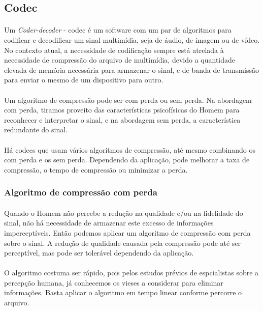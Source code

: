 \documentclass[a4paper,12pt]{article}
\begin{document}
\subsection{Codec}

\paragraph{}
Um \textit{Coder-decoder} - codec é um software com um par de algoritmos para codificar e decodificar um sinal multimídia, seja de áudio, de imagem ou de vídeo. No contexto atual, a necessidade de codificação sempre está atrelada à necessidade de compressão do arquivo de multimídia, devido a quantidade elevada de memória necessária para armazenar o sinal, e de banda de transmissão para enviar o mesmo de um dispositivo para outro.

\paragraph{}
Um algoritmo de compressão pode ser com perda ou sem perda. Na abordagem com perda, tiramos proveito das características psicofísicas do Homem para reconhecer e interpretar o sinal, e na abordagem sem perda, a característica redundante do sinal.

\paragraph{}
Há codecs que usam vários algoritmos de compressão, até mesmo combinando os com perda e os sem perda. Dependendo da aplicação, pode melhorar a taxa de compressão, o tempo de compressão ou minimizar a perda.

\subsubsection{Algoritmo de compressão com perda}
\paragraph{}
Quando o Homem não percebe a redução na qualidade e/ou na fidelidade do sinal, não há necessidade de armazenar este excesso de informações imperceptíveis. Então podemos aplicar um algoritmo de compressão com perda sobre o sinal.  A redução de qualidade causada pela compressão pode até ser perceptível, mas pode ser tolerável dependendo da aplicação.

\paragraph{}
O algoritmo costuma ser rápido, pois pelos estudos prévios de espcialistas sobre a percepção humana, já conhecemos os vieses a considerar para eliminar informações. Basta aplicar o algoritmo em tempo linear conforme percorre o arquivo.
\end{document}
